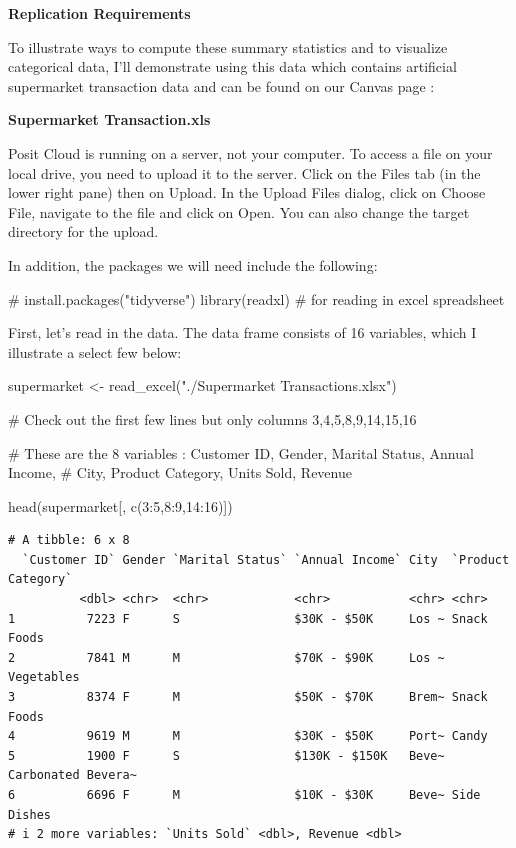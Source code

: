 \documentclass[
  letterpaper,
  DIV=11,
  numbers=noendperiod]{scrreprt}
\newenvironment{Shaded}{\begin{snugshade}}{\end{snugshade}}
\newcommand{\CommentTok}[1]{\textcolor[rgb]{0.37,0.37,0.37}{#1}}
\newcommand{\DecValTok}[1]{\textcolor[rgb]{0.68,0.00,0.00}{#1}}
\newcommand{\FunctionTok}[1]{\textcolor[rgb]{0.28,0.35,0.67}{#1}}
\newcommand{\NormalTok}[1]{\textcolor[rgb]{0.00,0.23,0.31}{#1}}
\newcommand{\OtherTok}[1]{\textcolor[rgb]{0.00,0.23,0.31}{#1}}
\newcommand{\SpecialCharTok}[1]{\textcolor[rgb]{0.37,0.37,0.37}{#1}}
\newcommand{\StringTok}[1]{\textcolor[rgb]{0.13,0.47,0.30}{#1}}
\begin{document}
\textbf{Replication Requirements}

To illustrate ways to compute these summary statistics and to visualize
categorical data, I'll demonstrate using this data which contains
artificial supermarket transaction data and can be found on our Canvas
page :

\textbf{Supermarket Transaction.xls}

Posit Cloud is running on a server, not your computer. To access a file
on your local drive, you need to upload it to the server. Click on the
Files tab (in the lower right pane) then on Upload. In the Upload Files
dialog, click on Choose File, navigate to the file and click on Open.
You can also change the target directory for the upload.

In addition, the packages we will need include the following:

\begin{Shaded}
\begin{Highlighting}[]
\CommentTok{\# install.packages("tidyverse")}
\FunctionTok{library}\NormalTok{(readxl)                   }\CommentTok{\# for reading in excel spreadsheet}
\end{Highlighting}
\end{Shaded}

First, let's read in the data. The data frame consists of 16 variables,
which I illustrate a select few below:

\begin{Shaded}
\begin{Highlighting}[]
\NormalTok{supermarket }\OtherTok{\textless{}{-}} \FunctionTok{read\_excel}\NormalTok{(}\StringTok{"./Supermarket Transactions.xlsx"}\NormalTok{)}

\CommentTok{\# Check out the first few lines but only columns 3,4,5,8,9,14,15,16}

\CommentTok{\# These are the 8 variables : Customer ID, Gender, Marital Status, Annual Income,}
\CommentTok{\# City, Product Category, Units Sold, Revenue}

\FunctionTok{head}\NormalTok{(supermarket[, }\FunctionTok{c}\NormalTok{(}\DecValTok{3}\SpecialCharTok{:}\DecValTok{5}\NormalTok{,}\DecValTok{8}\SpecialCharTok{:}\DecValTok{9}\NormalTok{,}\DecValTok{14}\SpecialCharTok{:}\DecValTok{16}\NormalTok{)])}
\end{Highlighting}
\end{Shaded}

\begin{verbatim}
# A tibble: 6 x 8
  `Customer ID` Gender `Marital Status` `Annual Income` City  `Product Category`
          <dbl> <chr>  <chr>            <chr>           <chr> <chr>             
1          7223 F      S                $30K - $50K     Los ~ Snack Foods       
2          7841 M      M                $70K - $90K     Los ~ Vegetables        
3          8374 F      M                $50K - $70K     Brem~ Snack Foods       
4          9619 M      M                $30K - $50K     Port~ Candy             
5          1900 F      S                $130K - $150K   Beve~ Carbonated Bevera~
6          6696 F      M                $10K - $30K     Beve~ Side Dishes       
# i 2 more variables: `Units Sold` <dbl>, Revenue <dbl>
\end{verbatim}
\end{document}
